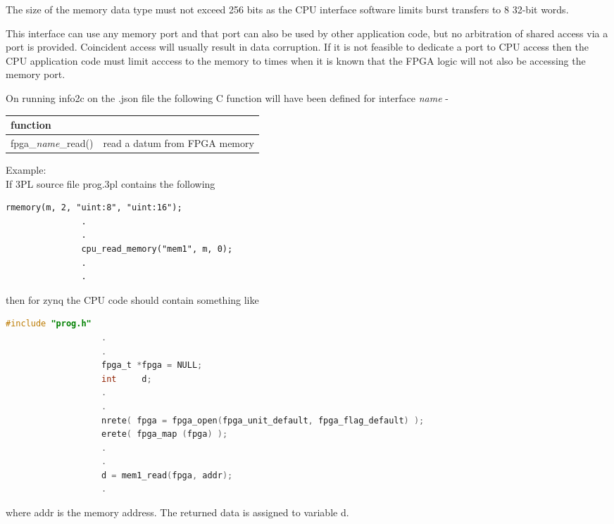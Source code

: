             The size of the memory data type must not exceed 256 bits as the CPU
            interface software limits burst transfers to 8 32-bit words.
            
            This interface can use any memory port and that port can also be
            used by other application code, but no arbitration of shared access
            via a port is provided. Coincident access will usually result in
            data corruption. If it is not feasible to dedicate a port to CPU
            access then the CPU application code must limit acccess to the
            memory to times when it is known that the FPGA logic will not also
            be accessing the memory port.
            
            On running info2c on the .json file the following C function will have been
            defined for interface {\em name} -
            
            \begin{tabular}{| l | l |}
            \hline
            function                 &                                \\ \hline \hline
            fpga\_{\em name}\_read() & read a datum from FPGA memory  \\ \hline
            \end{tabular}
            
            Example: \\
            If 3PL source file prog.3pl contains the following \\
            \begin{lstlisting}[gobble=12, language=threepl]
               rmemory(m, 2, "uint:8", "uint:16");
               .
               .
               cpu_read_memory("mem1", m, 0);
               .
               .
            \end{lstlisting}
            then for zynq the CPU code should contain something like \\
            \begin{lstlisting}[gobble=12, language=C]
                   #include "prog.h"
                   .
                   .
                   fpga_t *fpga = NULL;
                   int     d;
                   .
                   .
                   nrete( fpga = fpga_open(fpga_unit_default, fpga_flag_default) );
                   erete( fpga_map (fpga) );
                   .
                   .
                   d = mem1_read(fpga, addr);
                   .
            \end{lstlisting}
            where addr is the memory address. The returned data is assigned
            to variable d.

